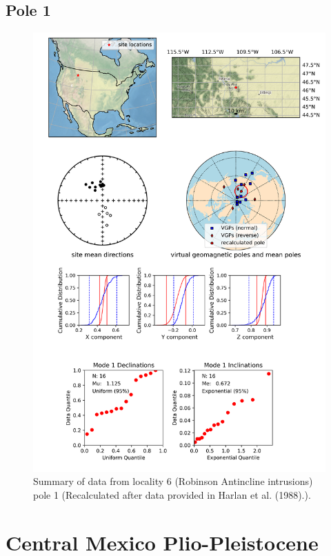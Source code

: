 \documentclass{article}
\begin{document}
\subsection{Pole 1}


\begin{figure}[H]
\centering
\includegraphics[width=5 in]{./6/1/pole_summary.png}
\caption{Summary of data from locality 6 (Robinson Antincline intrusions) pole 1 (Recalculated after data provided in Harlan et al. (1988).).}
\end{figure}

\section{Central Mexico Plio-Pleistocene}
\end{document}
